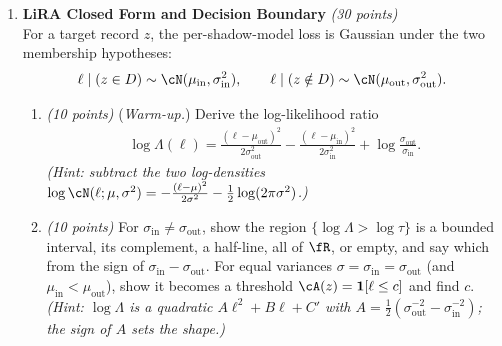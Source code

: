 \documentclass[12pt]{article}
\begin{document}
\begin{enumerate}
\begin{solution}
\begin{enumerate}
    \item Recall $a = \sqrt{\bar{\alpha}}$, $v = 1-\bar{\alpha}$, so $a/v = \sqrt{\bar{\alpha}}/(1-\bar{\alpha})$.

    \emph{Vanishing noise $\bar{\alpha} \to 1$:} $a \to 1$, $v \to 0^+$, so $a/v \to +\infty$ and for every $y \ne 0$, $\tanh(ay/v) \to \sign(y)$. The denoiser snaps to the nearest clean value $\pm1$ --- the bit is recoverable because almost no noise was added.

    \emph{Saturating noise $\bar{\alpha} \to 0$:} $a \to 0$, so $\tanh(ay/v) \to 0$ and $\fE[X_0\mid y] \to 0 = \fE[X_0]$: the observation carries no information, so the best estimate is the prior mean. Correspondingly the score collapses to $-y/v$, exactly the score of the pure-noise Gaussian $\cN(0,v)$.
\end{enumerate}
\end{solution}

\begin{problem}
    \newpage~\newpage
\end{problem}

\item {\bf LiRA Closed Form and Decision Boundary} {\it (30 points)}\\
For a target record $z$, the per-shadow-model loss is Gaussian under the two membership hypotheses:
\begin{align*}
    \ell \mid (z \in D) \sim \cN(\mu_{\mathrm{in}}, \sigma_{\mathrm{in}}^2), \qquad
    \ell \mid (z \notin D) \sim \cN(\mu_{\mathrm{out}}, \sigma_{\mathrm{out}}^2).
\end{align*}
\begin{enumerate}
    \item {\it (10 points)} (\emph{Warm-up.}) Derive the log-likelihood ratio
    \begin{align*}
        \log \Lambda(\ell) = \frac{(\ell - \mu_{\mathrm{out}})^2}{2\sigma_{\mathrm{out}}^2} - \frac{(\ell - \mu_{\mathrm{in}})^2}{2\sigma_{\mathrm{in}}^2} + \log\frac{\sigma_{\mathrm{out}}}{\sigma_{\mathrm{in}}}.
    \end{align*}
    \emph{(Hint: subtract the two log-densities $\log\cN(\ell;\mu,\sigma^2) = -\frac{(\ell-\mu)^2}{2\sigma^2} - \frac{1}{2}\log(2\pi\sigma^2)$.)}

    \item {\it (10 points)} For $\sigma_{\mathrm{in}} \ne \sigma_{\mathrm{out}}$, show the region $\{\log\Lambda > \log\tau\}$ is a bounded interval, its complement, a half-line, all of $\fR$, or empty, and say which from the sign of $\sigma_{\mathrm{in}} - \sigma_{\mathrm{out}}$. For equal variances $\sigma = \sigma_{\mathrm{in}} = \sigma_{\mathrm{out}}$ (and $\mu_{\mathrm{in}} < \mu_{\mathrm{out}}$), show it becomes a threshold $\cA(z) = \mathbf{1}[\ell \le c]$ and find $c$.\\
    \emph{(Hint: $\log\Lambda$ is a quadratic $A\ell^2 + B\ell + C'$ with $A = \frac{1}{2}(\sigma_{\mathrm{out}}^{-2} - \sigma_{\mathrm{in}}^{-2})$; the sign of $A$ sets the shape.)}


\end{enumerate}
\end{enumerate}
\end{document}
